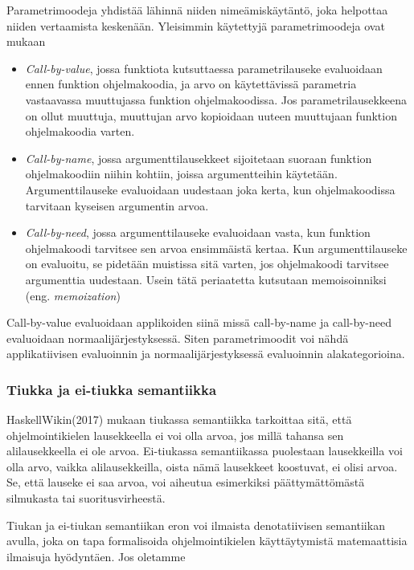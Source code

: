 Parametrimoodeja yhdistää lähinnä niiden nimeämiskäytäntö, joka helpottaa niiden vertaamista keskenään. Yleisimmin käytettyjä parametrimoodeja ovat \citet{scott2009programming} mukaan

\begin{itemize}
	\item \textit{Call-by-value}, jossa funktiota kutsuttaessa parametrilauseke evaluoidaan ennen funktion ohjelmakoodia, ja arvo on käytettävissä parametria vastaavassa muuttujassa funktion ohjelmakoodissa. Jos parametrilausekkeena on ollut muuttuja, muuttujan arvo kopioidaan uuteen muuttujaan funktion ohjelmakoodia varten.
    \item \textit{Call-by-name}, jossa argumenttilausekkeet sijoitetaan suoraan funktion ohjelmakoodiin niihin kohtiin, joissa argumentteihin käytetään. Argumenttilauseke evaluoidaan uudestaan joka kerta, kun ohjelmakoodissa tarvitaan kyseisen argumentin arvoa.
    \item \textit{Call-by-need}, jossa argumenttilauseke evaluoidaan vasta, kun funktion ohjelmakoodi tarvitsee sen arvoa ensimmäistä kertaa. Kun argumenttilauseke on evaluoitu, se pidetään muistissa sitä varten, jos ohjelmakoodi tarvitsee argumenttia uudestaan. Usein tätä periaatetta kutsutaan memoisoinniksi (eng. \textit{memoization})
\end{itemize}

Call-by-value evaluoidaan applikoiden siinä missä call-by-name ja call-by-need evaluoidaan normaalijärjestyksessä. Siten parametrimoodit voi nähdä applikatiivisen evaluoinnin ja normaalijärjestyksessä evaluoinnin alakategorioina.

\subsubsection{Tiukka ja ei-tiukka semantiikka}

HaskellWikin(2017) mukaan tiukassa semantiikka tarkoittaa sitä, että ohjelmointikielen lausekkeella ei voi olla arvoa, jos millä tahansa sen alilausekkeella ei ole arvoa.  Ei-tiukassa semantiikassa puolestaan lausekkeilla voi olla arvo, vaikka alilausekkeilla, oista nämä lausekkeet koostuvat, ei olisi arvoa. Se, että lauseke ei saa arvoa, voi aiheutua esimerkiksi päättymättömästä silmukasta tai suoritusvirheestä.

Tiukan ja ei-tiukan semantiikan eron voi ilmaista denotatiivisen semantiikan avulla, joka on tapa formalisoida ohjelmointikielen käyttäytymistä matemaattisia ilmaisuja hyödyntäen. Jos oletamme 


